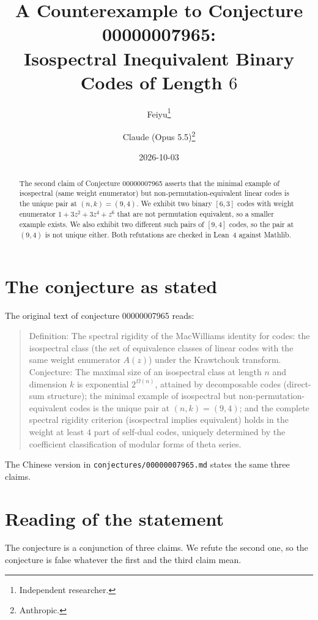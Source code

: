 \documentclass[11pt]{article}
\title{A Counterexample to Conjecture 00000007965:\\
Isospectral Inequivalent Binary Codes of Length $6$}
\author{%
  Feiyu\thanks{Independent researcher.}
  \and
  Claude (Opus 5.5)\thanks{Anthropic.}%
}
\date{2026-10-03}
\theoremstyle{plain}
\theoremstyle{definition}
\theoremstyle{remark}
\begin{document}
\maketitle

\begin{abstract}
The second claim of Conjecture 00000007965 asserts that the minimal example of
isospectral (same weight enumerator) but non-permutation-equivalent linear codes is
the unique pair at $(n,k)=(9,4)$. We exhibit two binary $[6,3]$ codes with weight
enumerator $1+3z^2+3z^4+z^6$ that are not permutation equivalent, so a smaller
example exists. We also exhibit two different such pairs of $[9,4]$ codes, so the
pair at $(9,4)$ is not unique either. Both refutations are checked in Lean~4
against Mathlib.
\end{abstract}

\section{The conjecture as stated}

The original text of conjecture 00000007965 reads:

\begin{quote}
Definition: The spectral rigidity of the MacWilliams identity for codes: the
isospectral class (the set of equivalence classes of linear codes with the same
weight enumerator $A(z)$) under the Krawtchouk transform. Conjecture: The maximal
size of an isospectral class at length $n$ and dimension $k$ is exponential
$2^{\Omega(n)}$, attained by decomposable codes (direct-sum structure); the minimal
example of isospectral but non-permutation-equivalent codes is the unique pair at
$(n,k) = (9,4)$; and the complete spectral rigidity criterion (isospectral implies
equivalent) holds in the weight at least $4$ part of self-dual codes, uniquely
determined by the coefficient classification of modular forms of theta series.
\end{quote}

The Chinese version in \texttt{conjectures/00000007965.md} states the same three
claims.

\section{Reading of the statement}

The conjecture is a conjunction of three claims. We refute the second one, so the
conjecture is false whatever the first and the third claim mean.
\end{document}
